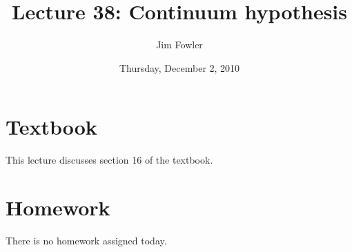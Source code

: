 \documentclass[12pt]{handout}
\title{Lecture 38: Continuum hypothesis}
\author{Jim Fowler}
\date{Thursday, December  2, 2010}
\begin{document}
\maketitle

\section*{Textbook}

This lecture discusses section 16 of the textbook.

\section*{Homework} 

There is no homework assigned today.
\end{document}
